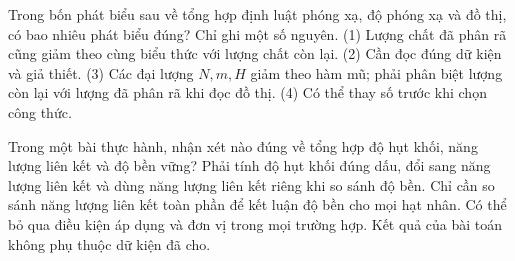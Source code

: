 \begin{ex}
Trong bốn phát biểu sau về tổng hợp định luật phóng xạ, độ phóng xạ và đồ thị, có bao nhiêu phát biểu đúng? Chỉ ghi một số nguyên. (1) Lượng chất đã phân rã cũng giảm theo cùng biểu thức với lượng chất còn lại. (2) Cần đọc đúng dữ kiện và giả thiết. (3) Các đại lượng $N,m,H$ giảm theo hàm mũ; phải phân biệt lượng còn lại với lượng đã phân rã khi đọc đồ thị. (4) Có thể thay số trước khi chọn công thức.
\end{ex}

\begin{ex}
Trong một bài thực hành, nhận xét nào đúng về tổng hợp độ hụt khối, năng lượng liên kết và độ bền vững?
\choice
{\True Phải tính độ hụt khối đúng dấu, đổi sang năng lượng liên kết và dùng năng lượng liên kết riêng khi so sánh độ bền.}
{Chỉ cần so sánh năng lượng liên kết toàn phần để kết luận độ bền cho mọi hạt nhân.}
{Có thể bỏ qua điều kiện áp dụng và đơn vị trong mọi trường hợp.}
{Kết quả của bài toán không phụ thuộc dữ kiện đã cho.}
\end{ex}

